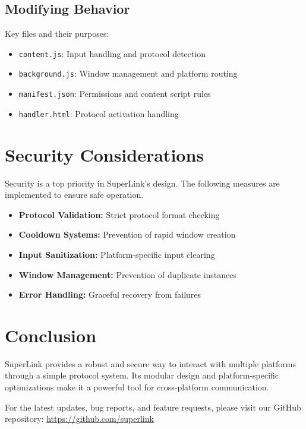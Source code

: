\documentclass[12pt]{article}
\begin{document}
\subsection{Modifying Behavior}
Key files and their purposes:
\begin{itemize}
    \item \texttt{content.js}: Input handling and protocol detection
    \item \texttt{background.js}: Window management and platform routing
    \item \texttt{manifest.json}: Permissions and content script rules
    \item \texttt{handler.html}: Protocol activation handling
\end{itemize}

\section{Security Considerations}
\begin{warningbox}
Security is a top priority in SuperLink's design. The following measures are implemented to ensure safe operation.
\end{warningbox}

\begin{itemize}
    \item \textbf{Protocol Validation:} Strict protocol format checking
    \item \textbf{Cooldown Systems:} Prevention of rapid window creation
    \item \textbf{Input Sanitization:} Platform-specific input clearing
    \item \textbf{Window Management:} Prevention of duplicate instances
    \item \textbf{Error Handling:} Graceful recovery from failures
\end{itemize}

\section{Conclusion}
SuperLink provides a robust and secure way to interact with multiple platforms through a simple protocol system. Its modular design and platform-specific optimizations make it a powerful tool for cross-platform communication.

\begin{infobox}
For the latest updates, bug reports, and feature requests, please visit our GitHub repository: \url{https://github.com/superlink}
\end{infobox}
\end{document}
